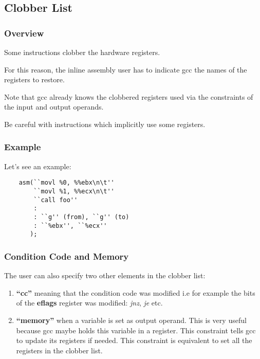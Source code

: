 %
%

\subsection{Clobber List}


\begin{frame}
  \frametitle{Overview}

  Some instructions clobber the hardware registers.

  \-

  For this reason, the inline assembly user has to indicate gcc the names
  of the registers to restore.

  \-

  Note that gcc already knows the clobbered registers used via the
  constraints of the input and output operands.

  \-

  Be careful with instructions which implicitly use some registers.
\end{frame}


\begin{frame}[containsverbatim]
  \frametitle{Example}

  Let's see an example:

  \begin{verbatim}
    asm(``movl %0, %%ebx\n\t''
        ``movl %1, %%ecx\n\t''
        ``call foo''
        :
        : ``g'' (from), ``g'' (to)
        : ``%ebx'', ``%ecx''
       );
  \end{verbatim}
\end{frame}


\begin{frame}
  \frametitle{Condition Code and Memory}

  The user can also specify two other elements in the clobber list:

  \begin{enumerate}
    \item
      \textbf{``cc''} meaning that the condition code was modified i.e
      for example the bits of the \textbf{eflags} register was modified:
      \textit{jnz}, \textit{je} etc.
    \item
      \textbf{``memory''} when a variable is set as output operand. This is
      very useful because gcc maybe holds this variable in a register.
      This constraint tells gcc to update its registers if needed.
      This constraint is equivalent to set all the registers in the
      clobber list.
  \end{enumerate}
\end{frame}

